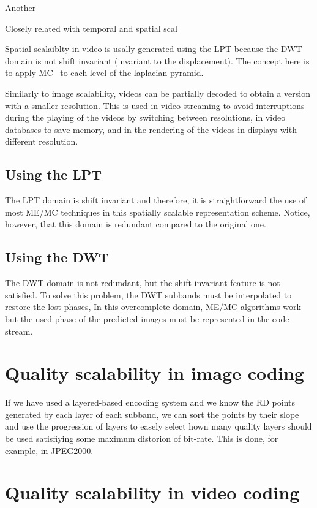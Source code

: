 Another

Closely related with temporal and spatial scal

Spatial scalaiblty in video is usally generated using the LPT because
the DWT domain is not shift invariant (invariant to the
displacement). The concept here is to apply MC~\cite{vruiz__MC} to
each level of the laplacian pyramid.

Similarly to image scalability, videos can be partially decoded to
obtain a version with a smaller resolution. This is used in video
streaming to avoid interruptions during the playing of the videos by
switching between resolutions, in video databases to save memory, and
in the rendering of the videos in displays with different resolution.

\subsection{Using the LPT}

The LPT domain is shift invariant and therefore, it is straightforward
the use of most ME/MC techniques in this spatially scalable
representation scheme. Notice, however, that this domain is redundant
compared to the original one.

\subsection{Using the DWT}

The DWT domain is not redundant, but the shift invariant feature is
not satisfied. To solve this problem, the DWT subbands must be
interpolated to restore the lost phases, In this overcomplete domain,
ME/MC algorithms work but the used phase of the predicted images must
be represented in the code-stream.


\section{Quality scalability in image coding}

If we have used a layered-based encoding system and we know the RD
points generated by each layer of each subband, we can sort the points
by their slope and use the progression of layers to easely select hown
many quality layers should be used satisfiying some maximum distorion
of bit-rate. This is done, for example, in JPEG2000.

\section{Quality scalability in video coding}

